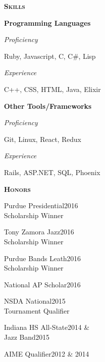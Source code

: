 \documentclass[11pt]{article}
\newcommand{\sectionfont}{\Large\scshape\bfseries\color{cg505green}}
\begin{document}
\begin{minipage}[t]{0.3\textwidth}
  \vspace{5pt}

  {\sectionfont Skills}

  \textbf{Programming Languages}
  \begin{adjustwidth}{10pt}{}
    \emph{Proficiency}

    \quad Ruby, Javascript, C, C\#, Lisp

    \emph{Experience}

    \quad C++, CSS, HTML, Java, Elixir
  \end{adjustwidth}

  \textbf{Other Tools/Frameworks}
  \begin{adjustwidth}{10pt}{}
    \emph{Proficiency}

    \quad Git, Linux, React, Redux

    \emph{Experience}

    \quad Rails, ASP.NET, SQL, Phoenix
  \end{adjustwidth}

  \vspace{5pt}

  {\sectionfont Honors}
  \begin{adjustwidth}{10pt}{}
    Purdue Presidential\hfill 2016\\
    Scholarship Winner

    Tony Zamora Jazz\hfill 2016\\
    Scholarship Winner

    Purdue Bands Leath\hfill 2016\\
    Scholarship Winner

    National AP Scholar\hfill 2016

    NSDA National\hfill 2015\\
    Tournament Qualifier

    Indiana HS All-State\hfill 2014 \&\\
    Jazz Band\hfill 2015

    AIME Qualifier\hfill 2012 \& 2014
  \end{adjustwidth}
\end{minipage}
\hfill\vrule\hfill{}
\end{document}
